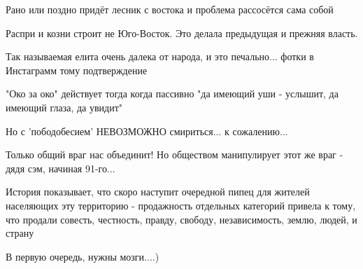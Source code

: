 \begin{itemize}
Рано или поздно придёт лесник с востока и проблема рассосётся сама собой

 
Распри и козни строит не Юго-Восток. Это делала предыдущая и прежняя власть.

 
Так называемая елита очень далека от народа, и это печально... 
фотки в Инстаграмм тому подтверждение

 
"Око за око" действует тогда когда пассивно "да имеющий уши - услышит, да имеющий глаза, да увидит"

 
Но с 'пободобесием' НЕВОЗМОЖНО смириться... к сожалению...

 
Только общий враг нас объединит! Но обществом манипулирует этот же враг - дядя сэм, начиная 91-го...


История показывает, что скоро наступит очередной пипец для жителей населяющих
эту территорию - продажность отдельных категорий привела к тому, что продали
совесть, честность, правду, свободу, независимость, землю, людей, и страну

 
В первую очередь, нужны мозги....)

 

\end{itemize}
